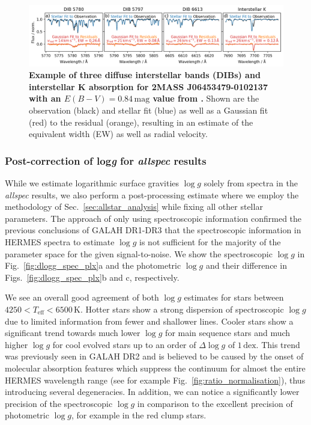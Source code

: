\documentclass[
  journal=pasa,
  manuscript=research-paper, %
  year=2024,
  volume=37
]{cup-journal}
\newcommand{\logg}{$\log g$\xspace}
\begin{document}
\begin{figure}[ht]
 \centering
 \includegraphics[width=\textwidth]{figures/example_dibs_06453479-0102137.png}
 \caption{\textbf{Example of three diffuse interstellar bands (DIBs) and interstellar K absorption for 2MASS J06453479-0102137 with an $E(B-V) = 0.84\,\mathrm{mag}$ value from \citet{Schlegel1998}.} Shown are the observation (black) and stellar fit (blue) as well as a Gaussian fit (red) to the residual (orange), resulting in an estimate of the equivalent width (EW) as well as radial velocity.} %
 \label{fig:example_dibs_06453479-0102137}
\end{figure}

\subsubsection{Post-correction of {log\textit{g}} for \textit{allspec} results}

While we estimate logarithmic surface gravities \logg solely from spectra in the \textit{allspec} results, we also perform a post-processing estimate where we employ the methodology of Sec.~\ref{sec:allstar_analysis} while fixing all other stellar parameters. The approach of only using spectroscopic information confirmed the previous conclusions of GALAH DR1-DR3 that the spectroscopic information in HERMES spectra to estimate \logg is not sufficient for the majority of the parameter space for the given signal-to-noise. We show the spectroscopic \logg in Fig.~\ref{fig:dlogg_spec_plx}a and the photometric \logg and their difference in Figs.~\ref{fig:dlogg_spec_plx}b and c, respectively.

We see an overall good agreement of both \logg estimates for stars between $4250 < T_\text{eff} < 6500\,\mathrm{K}$. Hotter stars show a strong dispersion of spectroscopic \logg due to limited information from fewer and shallower lines. Cooler stars show a significant trend towards much lower \logg for main sequence stars and much higher \logg for cool evolved stars up to an order of $\Delta \log g$ of $1\,\mathrm{dex}$. This trend was previously seen in GALAH DR2 \citep{Buder2018} and is believed to be caused by the onset of molecular absorption features which suppress the continuum for almost the entire HERMES wavelength range (see for example Fig.~\ref{fig:ratio_normalisation}), thus introducing several degeneracies. In addition, we can notice a significantly lower precision of the spectroscopic \logg in comparison to the excellent precision of photometric \logg, for example in the red clump stars.
\end{document}
